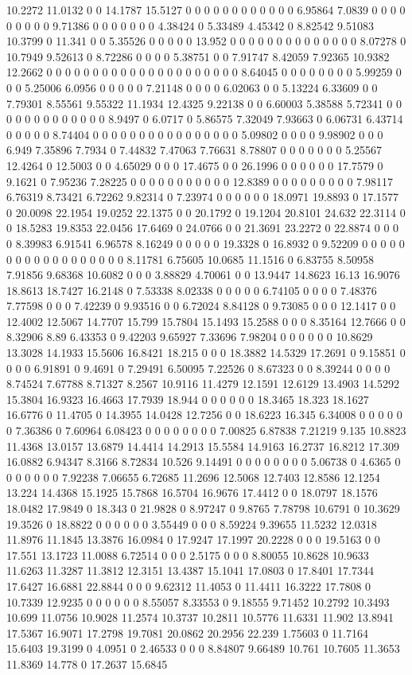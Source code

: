 10.2272 11.0132 0 0 14.1787 15.5127 0 0 0 0 0 0 0 0 0 0 0 0 6.95864 7.0839 0 0 0 0 0 0 0 0 0 9.71386 0 0 0 0 0 0 0 4.38424 0 5.33489 4.45342 0 8.82542 9.51083 10.3799 0 11.341 0 0 5.35526 0 0 0 0 0 13.952 0 0 0 0 0 0 0 0 0 0 0 0 0 0 8.07278 0 10.7949 9.52613 0 8.72286 0 0 0 0 5.38751 0 0 7.91747 8.42059 7.92365 10.9382 12.2662 0 0 0 0 0 0 0 0 0 0 0 0 0 0 0 0 0 0 0 0 0 8.64045 0 0 0 0 0 0 0 0 5.99259 0 0 0 5.25006 6.0956 0 0 0 0 0 7.21148 0 0 0 0 6.02063 0 0 5.13224 6.33609 0 0 7.79301 8.55561 9.55322 11.1934 12.4325 9.22138 0 0 6.60003 5.38588 5.72341 0 0 0 0 0 0 0 0 0 0 0 0 0 8.9497 0 6.0717 0 5.86575 7.32049 7.93663 0 6.06731 6.43714 0 0 0 0 0 8.74404 0 0 0 0 0 0 0 0 0 0 0 0 0 0 0 0 5.09802 0 0 0 0 9.98902 0 0 0 6.949 7.35896 7.7934 0 7.44832 7.47063 7.76631 8.78807 0 0 0 0 0 0 0 5.25567 12.4264 0 12.5003 0 0 4.65029 0 0 0 17.4675 0 0 26.1996 0 0 0 0 0 0 17.7579 0 9.1621 0 7.95236 7.28225 0 0 0 0 0 0 0 0 0 0 0 12.8389 0 0 0 0 0 0 0 0 0 7.98117 6.76319 8.73421 6.72262 9.82314 0 7.23974 0 0 0 0 0 0 18.0971 19.8893 0 17.1577 0 20.0098 22.1954 19.0252 22.1375 0 0 20.1792 0 19.1204 20.8101 24.632 22.3114 0 0 18.5283 19.8353 22.0456 17.6469 0 24.0766 0 0 21.3691 23.2272 0 22.8874 0 0 0 0 8.39983 6.91541 6.96578 8.16249 0 0 0 0 0 19.3328 0 16.8932 0 9.52209 0 0 0 0 0 0 0 0 0 0 0 0 0 0 0 0 0 0 8.11781 6.75605 10.0685 11.1516 0 6.83755 8.50958 7.91856 9.68368 10.6082 0 0 0 3.88829 4.70061 0 0 13.9447 14.8623 16.13 16.9076 18.8613 18.7427 16.2148 0 7.53338 8.02338 0 0 0 0 0 6.74105 0 0 0 0 7.48376 7.77598 0 0 0 7.42239 0 9.93516 0 0 6.72024 8.84128 0 9.73085 0 0 0 12.1417 0 0 12.4002 12.5067 14.7707 15.799 15.7804 15.1493 15.2588 0 0 0 8.35164 12.7666 0 0 8.32906 8.89 6.43353 0 9.42203 9.65927 7.33696 7.98204 0 0 0 0 0 0 10.8629 13.3028 14.1933 15.5606 16.8421 18.215 0 0 0 18.3882 14.5329 17.2691 0 9.15851 0 0 0 0 6.91891 0 9.4691 0 7.29491 6.50095 7.22526 0 8.67323 0 0 8.39244 0 0 0 0 8.74524 7.67788 8.71327 8.2567 10.9116 11.4279 12.1591 12.6129 13.4903 14.5292 15.3804 16.9323 16.4663 17.7939 18.944 0 0 0 0 0 0 18.3465 18.323 18.1627 16.6776 0 11.4705 0 14.3955 14.0428 12.7256 0 0 18.6223 16.345 6.34008 0 0 0 0 0 0 7.36386 0 7.60964 6.08423 0 0 0 0 0 0 0 0 7.00825 6.87838 7.21219 9.135 10.8823 11.4368 13.0157 13.6879 14.4414 14.2913 15.5584 14.9163 16.2737 16.8212 17.309 16.0882 6.94347 8.3166 8.72834 10.526 9.14491 0 0 0 0 0 0 0 0 5.06738 0 4.6365 0 0 0 0 0 0 0 7.92238 7.06655 6.72685 11.2696 12.5068 12.7403 12.8586 12.1254 13.224 14.4368 15.1925 15.7868 16.5704 16.9676 17.4412 0 0 18.0797 18.1576 18.0482 17.9849 0 18.343 0 21.9828 0 8.97247 0 9.8765 7.78798 10.6791 0 10.3629 19.3526 0 18.8822 0 0 0 0 0 0 3.55449 0 0 0 8.59224 9.39655 11.5232 12.0318 11.8976 11.1845 13.3876 16.0984 0 17.9247 17.1997 20.2228 0 0 0 19.5163 0 0 17.551 13.1723 11.0088 6.72514 0 0 0 2.5175 0 0 0 8.80055 10.8628 10.9633 11.6263 11.3287 11.3812 12.3151 13.4387 15.1041 17.0803 0 17.8401 17.7344 17.6427 16.6881 22.8844 0 0 0 9.62312 11.4053 0 11.4411 16.3222 17.7808 0 10.7339 12.9235 0 0 0 0 0 0 8.55057 8.33553 0 9.18555 9.71452 10.2792 10.3493 10.699 11.0756 10.9028 11.2574 10.3737 10.2811 10.5776 11.6331 11.902 13.8941 17.5367 16.9071 17.2798 19.7081 20.0862 20.2956 22.239 1.75603 0 11.7164 15.6403 19.3199 0 4.0951 0 2.46533 0 0 0 8.84807 9.66489 10.761 10.7605 11.3653 11.8369 14.778 0 17.2637 15.6845 
